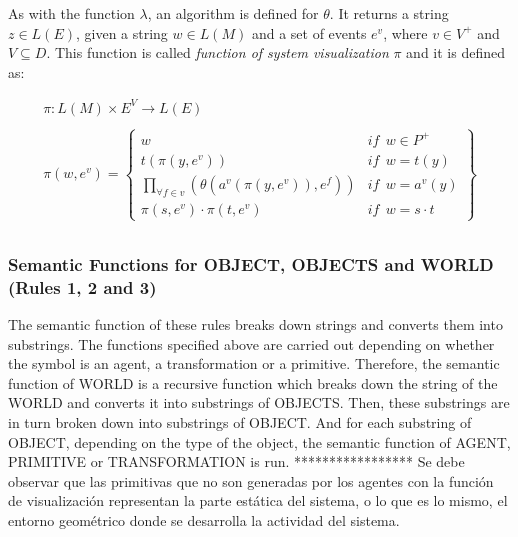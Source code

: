 \documentclass[runningheads]{llncs}
\begin{document}
As with the function $\lambda$, an algorithm is defined for $\theta$. It returns a string $z \in
L(E)$, given a string $w \in L(M)$ and a set of events $e^v$, where $v \in V^+$ and $V \subseteq
D$. This function is called \textit{function of system visualization} $\pi$ and it is defined as:


\begin{equation}
   \begin{array}{c}
    \pi: L(M) \times E^V \rightarrow L(E) \\
\\
    \pi (w, e^v) = \left\{
    \begin{array}{ll}
        w   & \mathit{if}  \ \ w \in P^+  \\

        t(\pi (y, e^v))     & \mathit{if}  \ \  w = t(y)  \\

        \underset{\forall f \in v}{ \prod }(\theta (a^v (\pi
            (y, e^v)), e^f))    & \mathit{if}  \ \ w = a^v(y)
\\

        \pi (s, e^v) \cdot \pi (t, e^v)    & \mathit{if}  \
\  w = s \cdot t
    \end{array}\right\} \\
   \end{array}
\end{equation}



\subsubsection{Semantic Functions for OBJECT, OBJECTS and WORLD (Rules 1,
2 and 3)
\label{sec:rules123}}
	
The semantic function of these rules breaks down strings and converts them into substrings. The
functions specified above are carried out depending on whether the symbol is an agent, a
transformation or a primitive. Therefore, the semantic function of WORLD is a recursive function
which breaks down the string of the WORLD and converts it into substrings of OBJECTS. Then, these
substrings are in turn broken down into substrings of OBJECT. And for each substring of OBJECT,
depending on the type of the object, the semantic function of AGENT, PRIMITIVE or TRANSFORMATION is
run. ***************** Se debe observar que las primitivas que no son generadas por los agentes con la función de visualización representan la parte estática del sistema, o lo que es lo mismo, el entorno geométrico donde se desarrolla la actividad del sistema.
\end{document}
